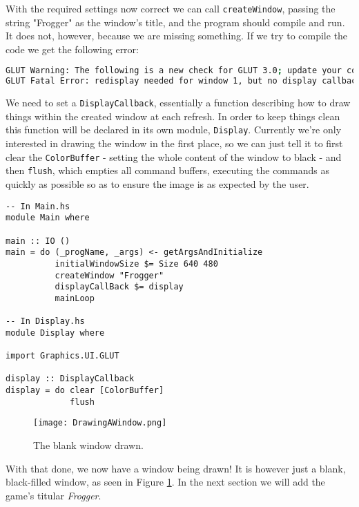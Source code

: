 \documentclass[12pt, a4paper]{report}
\begin{document}
\par

With the required settings now correct we can call \verb|createWindow|, passing the string "Frogger" as the window's title, and the program should compile and run.
It does not, however, because we are missing something.
If we try to compile the code we get the following error:

\begin{lstlisting}[language=sh, xleftmargin=-0.1\textwidth, xrightmargin=-0.1\textwidth]
GLUT Warning: The following is a new check for GLUT 3.0; update your code.
GLUT Fatal Error: redisplay needed for window 1, but no display callback.
\end{lstlisting}

We need to set a \verb|DisplayCallback|, essentially a function describing how to draw things within the created window at each refresh.
In order to keep things clean this function will be declared in its own module, \verb|Display|.
Currently we're only interested in drawing the window in the first place, so we can just tell it to first clear the \verb|ColorBuffer| - setting the whole content of the window to black - and then \verb|flush|, which empties all command buffers, executing the commands as quickly as possible so as to ensure the image is as expected by the user.

\begin{lstlisting}
-- In Main.hs
module Main where

main :: IO ()
main = do (_progName, _args) <- getArgsAndInitialize
          initialWindowSize $= Size 640 480
          createWindow "Frogger"
          displayCallBack $= display
          mainLoop

-- In Display.hs
module Display where

import Graphics.UI.GLUT

display :: DisplayCallback
display = do clear [ColorBuffer]
             flush
\end{lstlisting}

\par

\begin{figure}[ht]
  \centering
  \caption{The blank window drawn.}
  \texttt{[image: DrawingAWindow.png]}
  \label{fig:drawingawindow}
\end{figure}

With that done, we now have a window being drawn!
It is however just a blank, black-filled window, as seen in Figure \ref{fig:drawingawindow}.
In the next section we will add the game's titular \textit{Frogger}.
\end{document}
